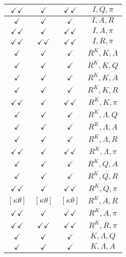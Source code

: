 \documentclass[a4paper,10pt]{article}
\begin{document}
\begin{longtable}{|c|c|c|c|}
\hline
$\checkmark\checkmark$ & $\checkmark$ & $\checkmark\checkmark$ & ${I},{Q},{\pi}$ \\
\hline
$\checkmark$ & $\checkmark$ & $\checkmark$ & ${I},{A},{R}$ \\
\hline
$\checkmark\checkmark$ & $\checkmark$ & $\checkmark\checkmark$ & ${I},{A},{\pi}$ \\
\hline
$\checkmark\checkmark$ & $\checkmark\checkmark$ & $\checkmark\checkmark$ & ${I},{R},{\pi}$ \\
\hline
$\checkmark$ & $\checkmark$ & $\checkmark$ & ${R^{K}},{K},{\Lambda}$ \\
\hline
$\checkmark$ & $\checkmark$ & $\checkmark$ & ${R^{K}},{K},{Q}$ \\
\hline
$\checkmark$ & $\checkmark$ & $\checkmark$ & ${R^{K}},{K},{A}$ \\
\hline
$\checkmark$ & $\checkmark$ & $\checkmark$ & ${R^{K}},{K},{R}$ \\
\hline
$\checkmark\checkmark$ & $\checkmark$ & $\checkmark\checkmark$ & ${R^{K}},{K},{\pi}$ \\
\hline
$\checkmark$ & $\checkmark$ & $\checkmark$ & ${R^{K}},{\Lambda},{Q}$ \\
\hline
$\checkmark$ & $\checkmark$ & $\checkmark$ & ${R^{K}},{\Lambda},{A}$ \\
\hline
$\checkmark$ & $\checkmark$ & $\checkmark$ & ${R^{K}},{\Lambda},{R}$ \\
\hline
$\checkmark\checkmark$ & $\checkmark$ & $\checkmark\checkmark$ & ${R^{K}},{\Lambda},{\pi}$ \\
\hline
$\checkmark$ & $\checkmark$ & $\checkmark$ & ${R^{K}},{Q},{A}$ \\
\hline
$\checkmark$ & $\checkmark$ & $\checkmark$ & ${R^{K}},{Q},{R}$ \\
\hline
$\checkmark\checkmark$ & $\checkmark$ & $\checkmark\checkmark$ & ${R^{K}},{Q},{\pi}$ \\
\hline
$[\kappa \theta ]$ & $[\kappa \theta ]$ & $[\kappa \theta ]$ & ${R^{K}},{A},{R}$ \\
\hline
$\checkmark\checkmark$ & $\checkmark$ & $\checkmark\checkmark$ & ${R^{K}},{A},{\pi}$ \\
\hline
$\checkmark\checkmark$ & $\checkmark\checkmark$ & $\checkmark\checkmark$ & ${R^{K}},{R},{\pi}$ \\
\hline
$\checkmark$ & $\checkmark$ & $\checkmark$ & ${K},{\Lambda},{Q}$ \\
\hline
$\checkmark$ & $\checkmark$ & $\checkmark$ & ${K},{\Lambda},{A}$ \\

\end{longtable}
\end{document}
